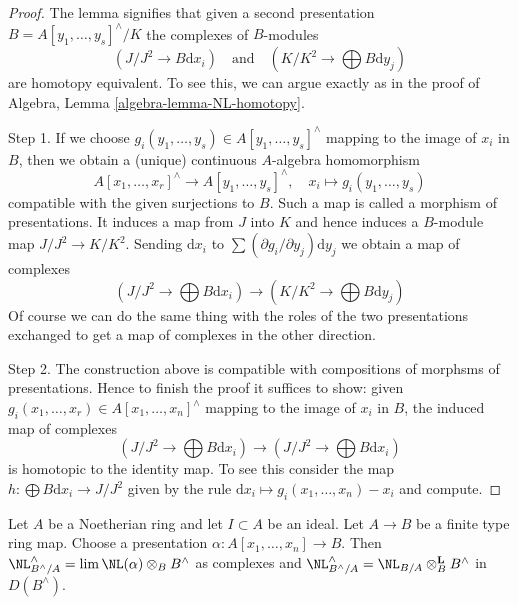 \begin{proof}
The lemma signifies that given a second presentation
$B = A[y_1, \ldots, y_s]^\wedge / K$ the complexes of $B$-modules
$$
(J/J^2 \to B\text{d}x_i)
\quad\text{and}\quad
(K/K^2 \to \bigoplus B\text{d}y_j)
$$
are homotopy equivalent. To see this, we can argue exactly as in
the proof of Algebra, Lemma \ref{algebra-lemma-NL-homotopy}.

\medskip\noindent
Step 1. If we choose $g_i(y_1, \ldots, y_s) \in A[y_1, \ldots, y_s]^\wedge$
mapping to the image of $x_i$ in $B$, then we obtain a (unique) continuous
$A$-algebra homomorphism
$$
A[x_1, \ldots, x_r]^\wedge \to A[y_1, \ldots, y_s]^\wedge,\quad
x_i \mapsto g_i(y_1, \ldots, y_s)
$$
compatible with the given surjections to $B$. Such a map is called
a morphism of presentations. It induces a map from $J$ into $K$
and hence induces a $B$-module map $J/J^2 \to K/K^2$. Sending
$\text{d}x_i$ to $\sum (\partial g_i/\partial y_j)\text{d}y_j$
we obtain a map of complexes
$$
(J/J^2 \to \bigoplus B\text{d}x_i)
\longrightarrow
(K/K^2 \to \bigoplus B\text{d}y_j)
$$
Of course we can do the same thing with the roles of the two presentations
exchanged to get a map of complexes in the other direction.

\medskip\noindent
Step 2. The construction above is compatible with compositions of morphsms
of presentations. Hence to finish the proof it suffices to show: given
$g_i(x_1, \ldots, x_r) \in A[x_1, \ldots, x_n]^\wedge$
mapping to the image of $x_i$ in $B$, the induced map of complexes
$$
(J/J^2 \to \bigoplus B\text{d}x_i)
\longrightarrow
(J/J^2 \to \bigoplus B\text{d}x_i)
$$
is homotopic to the identity map. To see this consider the map
$h : \bigoplus B \text{d}x_i \to J/J^2$ given by the rule
$\text{d}x_i \mapsto g_i(x_1, \ldots, x_n) - x_i$ and compute.
\end{proof}

\begin{lemma}
\label{lemma-NL-is-completion}
Let $A$ be a Noetherian ring and let $I \subset A$ be an ideal.
Let $A \to B$ be a finite type ring map. Choose a presentation
$\alpha : A[x_1, \ldots, x_n] \to B$. Then
$\NL_{B^\wedge/A}^\wedge = \lim \NL(\alpha) \otimes_B B^\wedge$
as complexes and
$\NL_{B^\wedge/A}^\wedge = \NL_{B/A} \otimes_B^\mathbf{L} B^\wedge$
in $D(B^\wedge)$.
\end{lemma}

